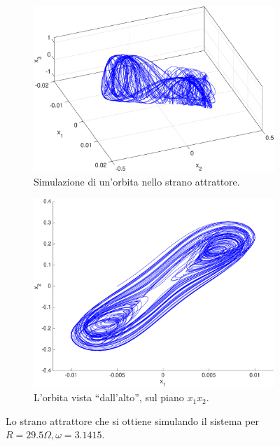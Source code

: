 \begin{figure}
    \centering
    \begin{subfigure}[b]{\textwidth}
        \includegraphics[width=\textwidth]{matcont/StranoAttrattore}
        \caption{Simulazione di un'orbita nello strano attrattore.}
    \end{subfigure}
    \par\bigskip
    \begin{subfigure}[b]{0.85\textwidth}
        \includegraphics[width=\textwidth]{matcont/StranoAttrattore2D}
        \caption{L'orbita vista ``dall'alto'', sul piano $x_1 x_2$.}
    \end{subfigure}
    \caption{Lo strano attrattore che si ottiene simulando il sistema per $R=29.5 \Omega, \omega = 3.1415$.}
    \label{fig:strano-attrattore}
\end{figure}
